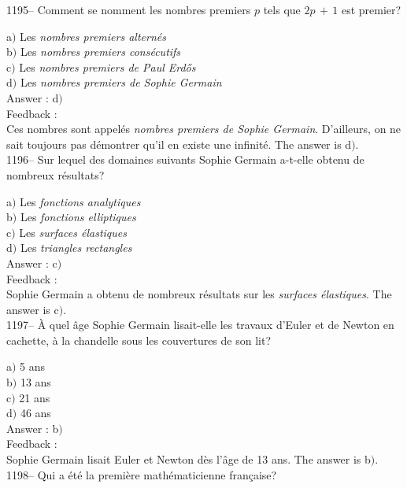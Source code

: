 \documentclass[letterpaper, 12pt]{article}
\begin{document}
1195-- Comment se nomment les nombres premiers $p$ tels que
$2p\,+\,1$ est premier?

a$)$ Les {\sl nombres premiers altern\'es} \\
b$)$ Les {\sl nombres premiers cons\'ecutifs} \\
c$)$ Les {\sl nombres premiers de Paul Erd\H{o}s} \\
d$)$ Les {\sl nombres premiers de Sophie Germain}\\

Answer : d$)$\\

Feedback : \\
Ces nombres sont appel\'es {\sl nombres premiers de Sophie Germain}.
D'ailleurs, on ne sait toujours pas d\'emontrer qu'il en existe une
infinit\'e.
The answer is d$)$.\\

1196-- Sur lequel des domaines suivants Sophie Germain a-t-elle
obtenu de nombreux r\'esultats?

a$)$ Les {\sl fonctions analytiques} \\
b$)$ Les {\sl fonctions elliptiques} \\
c$)$ Les {\sl surfaces \'elastiques} \\
d$)$ Les {\sl triangles rectangles}\\

Answer : c$)$\\

Feedback : \\
Sophie Germain a obtenu de nombreux r\'esultats sur les {\sl
surfaces \'elastiques}.
The answer is c$)$.\\

1197-- \`A quel \^age Sophie Germain lisait-elle les travaux d'Euler
et de Newton en cachette, \`a la chandelle sous les couvertures de
son lit?

a$)$ 5 ans \\
b$)$ 13 ans \\
c$)$ 21 ans \\
d$)$ 46 ans\\

Answer : b$)$\\

Feedback : \\
Sophie Germain lisait Euler et Newton d\`es l'\^age de 13 ans.
The answer is b$)$.\\

1198-- Qui a \'et\'e la premi\`ere math\'ematicienne fran\c caise?
\end{document}
